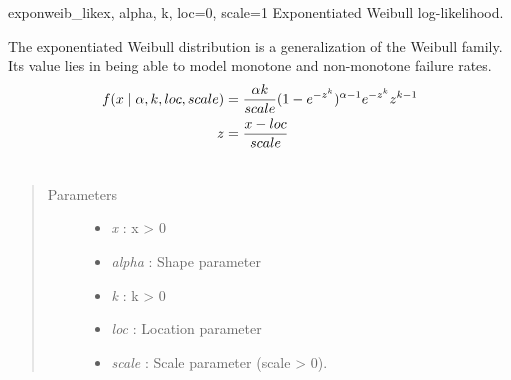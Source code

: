 \hypertarget{pymc.distributions.exponweib_like}{}\begin{funcdesc}{exponweib\_like}{x, alpha, k, loc=0, scale=1}
Exponentiated Weibull log-likelihood.

The exponentiated Weibull distribution is a generalization of the Weibull
family. Its value lies in being able to model monotone and non-monotone
failure rates.
\begin{gather}
\begin{split}f(x \mid \alpha,k,loc,scale)  & = \frac{\alpha k}{scale} (1-e^{-z^k})^{\alpha-1} e^{-z^k} z^{k-1} \\
z & = \frac{x-loc}{scale}\end{split}\notag\\\begin{split}\end{split}\notag
\end{gather}\begin{quote}\begin{description}
\item[Parameters] \leavevmode\begin{itemize}
\item {} 
\emph{x} : x \textgreater{} 0

\item {} 
\emph{alpha} : Shape parameter

\item {} 
\emph{k} : k \textgreater{} 0

\item {} 
\emph{loc} : Location parameter

\item {} 
\emph{scale} : Scale parameter (scale \textgreater{} 0).

\end{itemize}

\end{description}\end{quote}
\end{funcdesc}

